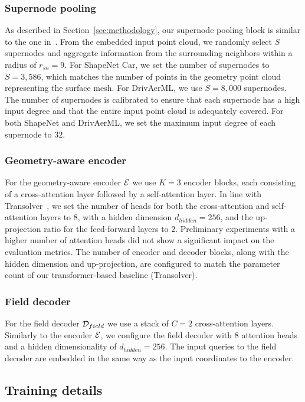 \subsubsection{Supernode pooling}
As described in Section~\ref{sec:methodology}, our supernode pooling block is similar to the one in~\cite{alkin2024universal}. 
From the embedded input point cloud, we randomly select $S$ supernodes and aggregate information from the surrounding neighbors within a radius of $r_{sn}=9$. 
For ShapeNet Car, we set the number of supernodes to $S=3,586$, which matches the number of points in the geometry point cloud representing the surface mesh. 
For DrivAerML, we use $S=8,000$ supernodes. 
The number of supernodes is calibrated to ensure that each supernode has a high input degree and that the entire input point cloud is adequately covered. 
For both ShapeNet and DrivAerML, we set the maximum input degree of each supernode to $32$.

\subsubsection{Geometry-aware encoder}
For the geometry-aware encoder $\mathcal{E}$ we use $K=3$ encoder blocks, each consisting of a cross-attention layer followed by a self-attention layer. 
In line with Transolver~\cite{wu2024transolver}, we set the number of heads for both the cross-attention and self-attention layers to $8$, with a hidden dimension $d_{hidden} = 256$, and the up-projection ratio for the feed-forward layers to $2$. 
Preliminary experiments with a higher number of attention heads did not show a significant impact on the evaluation metrics.
The number of encoder and decoder blocks, along with the hidden dimension and up-projection, are configured to match the parameter count of our transformer-based baseline (Transolver).

\subsubsection{Field decoder}
For the field decoder $\mathcal{D}_{field}$ we use a stack of $C=2$ cross-attention layers.
Similarly to the encoder $\mathcal{E}$, we configure the field decoder with $8$ attention heads and a hidden dimensionality of $d_{hidden} = 256$. 
The input queries to the field decoder are embedded in the same way as the input coordinates to the encoder. 

\subsection{Training details}

